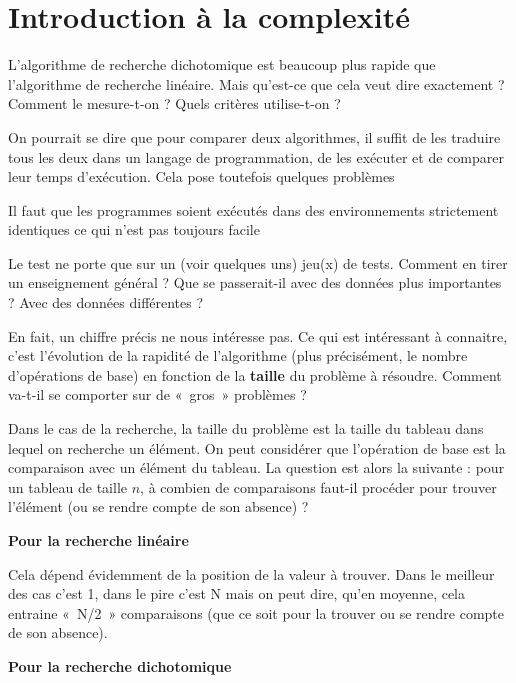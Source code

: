 \section{Introduction à la complexité}

	L’algorithme de recherche dichotomique est beaucoup plus rapide que
	l’algorithme de recherche linéaire. Mais qu’est-ce que cela veut dire
	exactement ? Comment le mesure-t-on ? Quels critères utilise-t-on ?

	On pourrait se dire que pour comparer deux algorithmes, il suffit de les
	traduire tous les deux dans un langage de programmation, de les
	exécuter et de comparer leur temps d’exécution. Cela pose toutefois
	quelques problèmes
			
	\liststyleListv
	\begin{liste}
		\item 
			Il faut que les programmes soient exécutés dans des environnements
			strictement identiques ce qui n’est pas toujours facile
		\item 
			Le test ne porte que sur un (voir quelques uns) jeu(x) de tests. Comment
			en tirer un enseignement général ? Que se passerait-il avec des données
			plus importantes ? Avec des données différentes ?
	\end{liste}
	
	En fait, un chiffre précis ne nous intéresse pas. Ce qui est intéressant
	à connaitre, c’est l’évolution de la rapidité de l’algorithme (plus
	précisément, le nombre d’opérations de base) en fonction de la
	\textbf{taille} du problème à résoudre. Comment va-t-il se comporter
	sur de «~gros~» problèmes ?

	Dans le cas de la recherche, la taille du problème est la taille du
	tableau dans lequel on recherche un élément. On peut considérer que
	l’opération de base est la comparaison avec un élément du tableau. La
	question est alors la suivante : pour un tableau de taille $n$, à combien
	de comparaisons faut-il procéder pour trouver l’élément (ou se rendre
	compte de son absence) ?

	{\bfseries
	Pour la recherche linéaire}

		Cela dépend évidemment de la position de la valeur à trouver. Dans le
		meilleur des cas c’est 1, dans le pire c’est N mais on peut dire, qu’en
		moyenne, cela entraine «~N/2~» comparaisons (que ce soit pour la
		trouver ou se rendre compte de son absence).

	{\bfseries
	Pour la recherche dichotomique}

